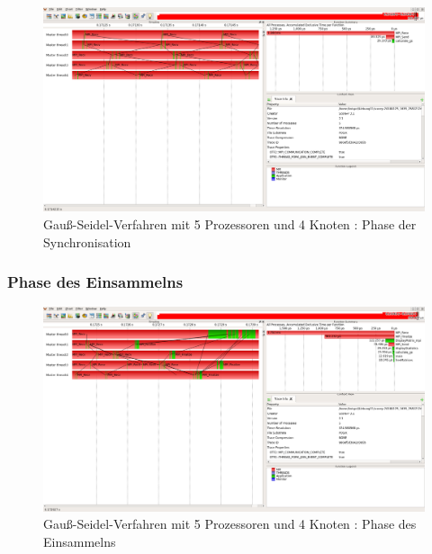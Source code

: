 \documentclass[11pt,a4paper]{article}
\begin{document}
\begin{figure}[htbp] %
   \centering
   \includegraphics[width=1\textwidth]{Seidel_2_4nodes.png} 
   \caption{Gauß-Seidel-Verfahren mit 5 Prozessoren und 4 Knoten : Phase der Synchronisation}
   \label{Seidel_2_4nodes}
\end{figure}

\subsubsection{Phase des Einsammelns}

\begin{figure}[htbp] %
   \centering
   \includegraphics[width=1\textwidth]{Seidel_3_4nodes.png} 
   \caption{Gauß-Seidel-Verfahren mit 5 Prozessoren und 4 Knoten : Phase des Einsammelns}
   \label{Seidel_3_4nodes}
\end{figure}
\end{document}
